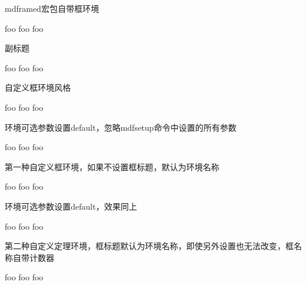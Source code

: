 \documentclass{article}
\begin{document}
mdframed宏包自带框环境
\begin{mdframed}
    foo foo foo
\end{mdframed}

副标题
\begin{mdframed}
    foo foo foo
\end{mdframed}


自定义框环境风格
\begin{mdframed}[style = mystyle]
    foo foo foo
\end{mdframed}

环境可选参数设置default，忽略mdfsetup命令中设置的所有参数
\begin{mdframed}[default,style = mystyle]
    foo foo foo
\end{mdframed}


第一种自定义框环境，如果不设置框标题，默认为环境名称
\begin{infobox}[backgroundcolor = yellow]
    foo foo foo
\end{infobox}

环境可选参数设置default，效果同上
\begin{infobox}[default,backgroundcolor = yellow]
    foo foo foo
\end{infobox}


第二种自定义定理环境，框标题默认为环境名称，即使另外设置也无法改变，框名称自带计数器
\begin{xyz}
    foo foo foo
\end{xyz}

\end{document}
